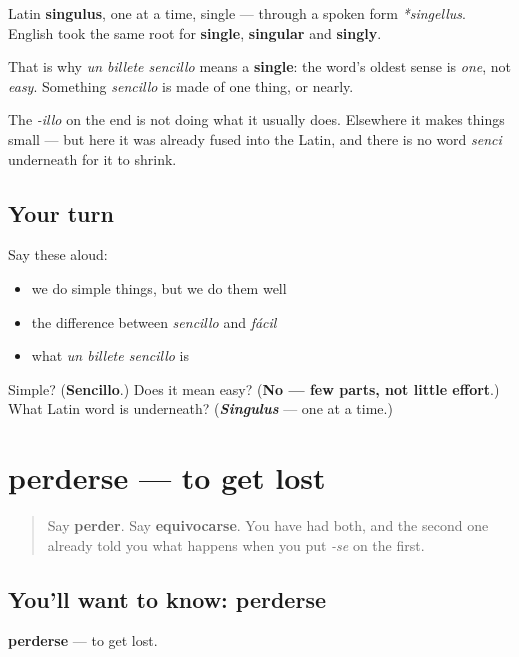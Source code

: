\begin{cousinweb}
Latin \textbf{singulus}, one at a time, single — through a spoken form \emph{*singellus}. English took the same root for \textbf{single}, \textbf{singular} and \textbf{singly}.

That is why \emph{un billete sencillo} means a \textbf{single}: the word's oldest sense is \emph{one}, not \emph{easy}. Something \emph{sencillo} is made of one thing, or nearly.

The \emph{-illo} on the end is not doing what it usually does. Elsewhere it makes things small — but here it was already fused into the Latin, and there is no word \emph{senci} underneath for it to shrink.
\end{cousinweb}

\subsection*{Your turn}
Say these aloud:

\begin{itemize}
\raggedright
  \item we do simple things, but we do them well
  \item the difference between \emph{sencillo} and \emph{fácil}
  \item what \emph{un billete sencillo} is
\end{itemize}

\begin{tcolorbox}[breakable,colback=teal!4,colframe=teal!35!black,title={Before you move on}]
Simple? (\textbf{Sencillo}.) Does it mean easy? (\textbf{No — few parts, not little effort}.) What Latin word is underneath? (\emph{\textbf{Singulus}} — one at a time.)
\end{tcolorbox}
\section[perderse]{perderse — to get lost}

\label{lesson:ES-C471-perderse}



\begin{quote}
Say \textbf{perder}. Say \textbf{equivocarse}. You have had both, and the second one already told you what happens when you put \emph{-se} on the first.
\end{quote}

\subsection*{You'll want to know: perderse}
\textbf{perderse} — to get lost.

